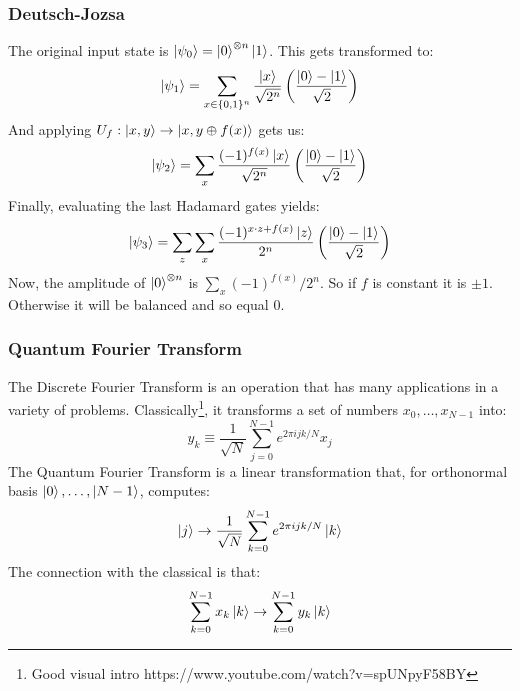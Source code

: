 \documentclass{beamer}
\begin{document}
\begin{frame}
    \frametitle{Deutsch-Jozsa}
    The original input state is $\ket{\psi_0} = \ket{0}^{\otimes n}\ket{1}$.
    This gets transformed to:
    \begin{equation}
        \ket{\psi_1} = \sum_{x \in \{0,1\}^n}\frac{\ket{x}}{\sqrt{2^n}}\left(\frac{\ket{0} -\ket{1}}{\sqrt{2}} \right)
    \end{equation}
    And applying $U_f: \ket{x,y} \to \ket{x, y \oplus f(x)}$ gets us:
    \begin{equation}
        \ket{\psi_2} = \sum_x \frac{(-1)^{f(x)} \ket{x}}{\sqrt{2^n}}\left(\frac{\ket{0} -\ket{1}}{\sqrt{2}} \right)
    \end{equation}
    Finally, evaluating the last Hadamard gates yields:
    \begin{equation}
        \ket{\psi_3} = \sum_z \sum_x \frac{(-1)^{x\cdot z + f(x)}\ket{z}}{2^n}\left(\frac{\ket{0} -\ket{1}}{\sqrt{2}} \right)
    \end{equation}
    Now, the amplitude of $\ket{0}^{\otimes n}$ is $\sum_x (-1)^{f(x)}/2^n$. So if $f$ is constant
    it is $\pm 1$. Otherwise it will be balanced and so equal $0$.
\end{frame}
\begin{frame}
    \frametitle{Quantum Fourier Transform}
    The Discrete Fourier Transform is an operation that has many applications in a variety of problems.
    Classically\footnote{Good visual intro https://www.youtube.com/watch?v=spUNpyF58BY}, it transforms a set of numbers $x_0, \dots, x_{N-1}$ into:
    \begin{equation}
        y_k \equiv \frac{1}{\sqrt{N}} \sum_{j=0}^{N - 1} e^{2\pi i j k / N} x_j
    \end{equation}
    The Quantum Fourier Transform is a linear transformation that,
    for orthonormal basis $\ket{0}, \dots, \ket{N -1}$, computes:
    \begin{equation}
        \ket{j} \to \frac{1}{\sqrt{N}} \sum_{k=0}^{N - 1} e^{2\pi i j k / N} \ket{k}
    \end{equation}
    The connection with the classical is that:
    \begin{equation}
        \sum_{k=0}^{N - 1} x_k \ket{k} \to  \sum_{k=0}^{N - 1} y_k \ket{k}
    \end{equation}
\end{frame}
\end{document}
